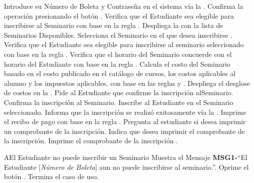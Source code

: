 	\begin{UCtrayectoria}
		\UCpaso[\UCactor] Introduce su Número de Boleta y Contraseña en el sistema vía la  \label{CU17Login}.
		\UCpaso[\UCactor] Confirma la operación presionando el botón .
		\UCpaso Verifica que el Estudiante sea elegible para inscribirse al Seminario con base en la regla  .
		\UCpaso Despliega la  con la lista de Seminarios Disponibles.
		\UCpaso[\UCactor] Selecciona el Seminario en el que desea inscribirse \label{CU17SeleccionarSeminario}.
		\UCpaso Verifica que el Estudiante sea elegible para inscribirse al seminario seleccionado con base en la regla  .
		\UCpaso Verifica que el horario del Seminario concuerde con el horario del Estudiante con base en la regla  .
		\UCpaso Calcula el costo del Seminario basado en el costo publicado en el catálogo de cursos, los costos aplicables al alumno y los impuestos aplicables, con base en las reglas  y .
		\UCpaso Despliega el desglose de costos en la .
		\UCpaso Pide al Estudiante que confirme la inscripción alSeminario.
		\UCpaso[\UCactor] Confirma la inscripción al Seminario.
		\UCpaso Inscribe al Estudiante en el Seminario seleccionado.
		\UCpaso Informa que la inscripción se realizó exitosamente vía la . 
		\UCpaso Imprime el recibo de pago con base en la regla .
		\UCpaso Pregunta al estudiante si desea imprimir un comprobante de la inscripción.
		\UCpaso[\UCactor] Indica que desea imprimir el comprobante de la inscripción.
		\UCpaso Imprime el comprobante de la inscripción .		
	\end{UCtrayectoria}

		\begin{UCtrayectoriaA}{A}{El Estudiante no puede inscribir un Seminario}
			\UCpaso Muestra el Mensaje {\bf MSG1-}``El Estudiante [{\em Número de Boleta}] aun no puede inscribirse al seminario.''.
			\UCpaso[\UCactor] Oprime el botón .
			\UCpaso[] Termina el caso de uso.
		\end{UCtrayectoriaA}
		
